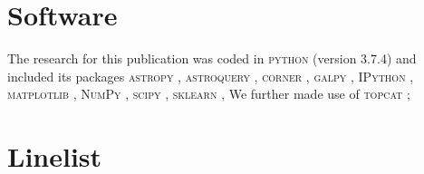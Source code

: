 \documentclass[
  journal=pasa,
  manuscript=research-paper, %
  year=2024,
  volume=37
]{cup-journal}
\begin{document}
\section*{Software}

The research for this publication was coded in \textsc{python} (version 3.7.4) and included its packages
\textsc{astropy} \citep[v. 3.2.2;][]{Robitaille2013,PriceWhelan2018},
\textsc{astroquery} \citep[v. 0.4;][]{Ginsburg2019},
\textsc{corner} \citep[v. 2.0.1;][]{corner},
\textsc{galpy} \citep[version 1.6.0;][]{Bovy2015},
\textsc{IPython} \citep[v. 7.8.0;][]{ipython},
\textsc{matplotlib} \citep[v. 3.1.3;][]{matplotlib},
\textsc{NumPy} \citep[v. 1.17.2;][]{numpy},
\textsc{scipy} \citep[version 1.3.1;][]{scipy},
\textsc{sklearn} \citep[v. 0.21.3;][]{scikit-learn},
We further made use of \textsc{topcat} \citep[version 4.7;][]{Taylor2005};

\section*{Linelist}
\end{document}
